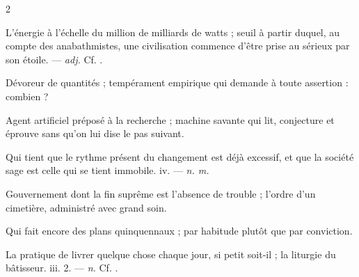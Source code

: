 \begin{multicols}{2}

 L'énergie à l'échelle du million de milliards de watts ; seuil à partir duquel, au compte des anabathmistes, une civilisation commence d'être prise au sérieux par son étoile. —  \textit{adj.} Cf. .

 Dévoreur de quantités ; tempérament empirique qui demande à toute assertion : combien ?

 Agent artificiel préposé à la recherche ; machine savante qui lit, conjecture et éprouve sans qu'on lui dise le pas suivant.  

 Qui tient que le rythme présent du changement est déjà excessif, et que la société sage est celle qui se tient immobile.   iv. —  \textit{n. m.}

 Gouvernement dont la fin suprême est l'absence de trouble ; l'ordre d'un cimetière, administré avec grand soin.

 Qui fait encore des plans quinquennaux ;  par habitude plutôt que par conviction.

 La pratique de livrer quelque chose chaque jour, si petit soit-il ; la liturgie du bâtisseur.   iii. 2. —  \textit{n.} Cf. .

\end{multicols}

